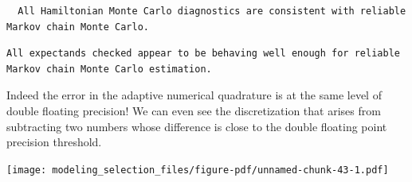 \documentclass[
  letterpaper,
  DIV=11,
  numbers=noendperiod]{scrartcl}
\newenvironment{Shaded}{\begin{snugshade}}{\end{snugshade}}
\newcommand{\AttributeTok}[1]{\textcolor[rgb]{0.40,0.45,0.13}{#1}}
\newcommand{\DecValTok}[1]{\textcolor[rgb]{0.68,0.00,0.00}{#1}}
\newcommand{\FunctionTok}[1]{\textcolor[rgb]{0.28,0.35,0.67}{#1}}
\newcommand{\NormalTok}[1]{\textcolor[rgb]{0.00,0.23,0.31}{#1}}
\newcommand{\OtherTok}[1]{\textcolor[rgb]{0.00,0.23,0.31}{#1}}
\newcommand{\SpecialCharTok}[1]{\textcolor[rgb]{0.37,0.37,0.37}{#1}}
\newcommand{\StringTok}[1]{\textcolor[rgb]{0.13,0.47,0.30}{#1}}
\begin{document}
\begin{verbatim}
  All Hamiltonian Monte Carlo diagnostics are consistent with reliable
Markov chain Monte Carlo.
\end{verbatim}

\begin{Shaded}
\end{Shaded}

\begin{verbatim}
All expectands checked appear to be behaving well enough for reliable
Markov chain Monte Carlo estimation.
\end{verbatim}

Indeed the error in the adaptive numerical quadrature is at the same
level of double floating precision! We can even see the discretization
that arises from subtracting two numbers whose difference is close to
the double floating point precision threshold.

\begin{Shaded}
\end{Shaded}

\texttt{[image: modeling\_selection\_files/figure-pdf/unnamed-chunk-43-1.pdf]}
\end{document}
